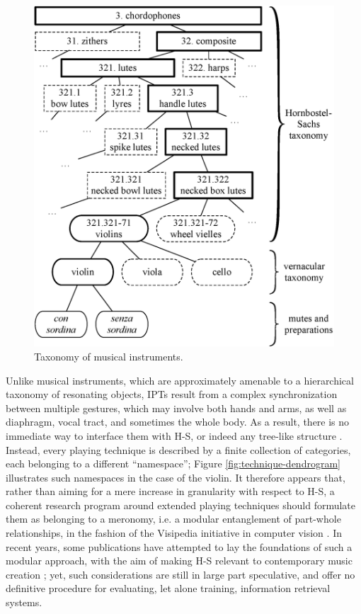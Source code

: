\documentclass{article}
\makeatletter
\newcommand*{\ie}{i.e.\@\xspace}
\makeatother
\begin{document}
\begin{figure}[t!]
\centering
\includegraphics[width=\linewidth]{./figs/dendrograms/instrument-dendrogram.eps}
\caption{Taxonomy of musical instruments.}
\label{fig:instrument-dendrogram}
\end{figure}

Unlike musical instruments, which are approximately amenable to a hierarchical taxonomy of resonating objects, IPTs result from a complex synchronization between multiple gestures, which may involve both hands and arms, as well as diaphragm, vocal tract, and sometimes the whole body.
As a result, there is no immediate way to interface them with H-S, or indeed any tree-like structure \cite{kolozali2011ismir}.
Instead, every playing technique is described by a finite collection of categories, each belonging to a different ``name\-space''; Figure \ref{fig:technique-dendrogram} illustrates such namespaces in the case of the violin.
It therefore appears that, rather than aiming for a mere increase in granularity with respect to H-S, a coherent research program around extended playing techniques should formulate them as belonging to a meronomy, \ie{} a modular entanglement of part-whole relationships, in the fashion of the Visipedia initiative in computer vision \cite{belongie2015pattern}.
In recent years, some publications have attempted to lay the foundations of such a modular approach, with the aim of making H-S relevant to contemporary music creation \cite{magnusson2017jnmr,weisser2011ytm}; yet, such considerations are still in large part speculative, and offer no definitive procedure for evaluating, let alone training, information retrieval systems.
\end{document}
